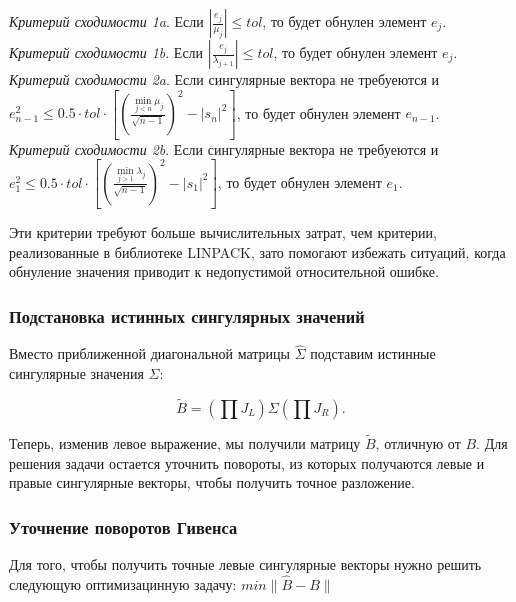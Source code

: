 \documentclass[12pt, a4paper]{report}
\theoremstyle{note}
\begin{document}
\noindent\textit{Критерий сходимости 1a}. Если $|\frac{e_j}{\mu_j}|\leq tol$, то будет обнулен элемент $e_j$.\vspace{1em}
\\\textit{Критерий сходимости 1b}. Если $|\frac{e_j}{\lambda_{j+1}}|\leq tol$, то будет обнулен элемент $e_j$.\vspace{1em}
\\\textit{Критерий сходимости 2a}. Если сингулярные вектора не требуеются и\linebreak $e^2_{n-1}\leq0.5\cdot tol\cdot [(\frac{\min\limits_{j<n}\mu_j}{\sqrt{n-1}})^2-|s_n|^2]$, то будет обнулен элемент $e_{n-1}$.\vspace{1em}
\\\textit{Критерий сходимости 2b}. Если сингулярные вектора не требуеются и\linebreak $e^2_1\leq0.5\cdot tol\cdot [(\frac{\min\limits_{j>1}\lambda_j}{\sqrt{n-1}})^2-|s_1|^2]$, то будет обнулен элемент $e_1$.\vspace{1em}

Эти критерии требуют больше вычислительных затрат, чем критерии, реализованные в библиотеке LINPACK, зато помогают избежать ситуаций, когда обнуление значения приводит к недопустимой относительной ошибке.

\subsubsection{Подстановка истинных сингулярных значений}

Вместо приближенной диагональной матрицы \( \widehat{\Sigma} \) подставим истинные сингулярные значения \( \Sigma \):

\begin{equation}
\tilde{B} = \left( \prod J_L \right) \Sigma \left( \prod J_R \right).
\end{equation}

Теперь, изменив левое выражение, мы получили матрицу $\tilde{B}$, отличную от $B$. Для решения задачи остается уточнить повороты, из которых получаются левые и правые сингулярные векторы, чтобы получить точное разложение.

\subsubsection{Уточнение поворотов Гивенса}

Для того, чтобы получить точные левые сингулярные векторы нужно решить следующую оптимизацинную задачу:
\( 
min\| \widehat{B} - B \| 
\)
\end{document}
